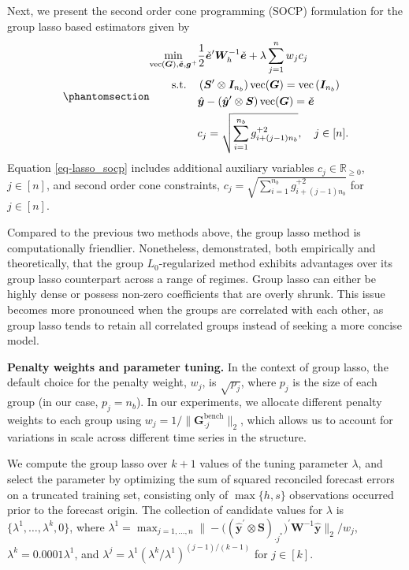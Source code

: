 \documentclass[
  11pt]{article}
\theoremstyle{plain}
\theoremstyle{remark}
\begin{document}
Next, we present the second order cone programming (SOCP) formulation
for the group lasso based estimators given by
\begin{equation}\phantomsection\label{eq-lasso_socp}{
\begin{aligned}
\min_{\operatorname{vec}(\bm{G}), \check{\bm{e}}, \bm{g}^{+}} & \frac{1}{2}\check{\bm{e}}^{\prime} \bm{W}_h^{-1}\check{\bm{e}} + \lambda \sum_{j=1}^n w_j c_j \\
\text{s.t.} \quad & \left(\bm{S}^{\prime} \otimes \bm{I}_{n_b}\right) \operatorname{vec}(\bm{G})=\operatorname{vec}\left(\bm{I}_{n_b}\right) \\
& \hat{\bm{y}}-\left(\hat{\bm{y}}^{\prime} \otimes \bm{S}\right) \operatorname{vec}(\bm{G}) = \check{\bm{e}} \\
& c_j = \sqrt{\sum_{i=1}^{n_b} g_{i + (j-1) n_b}^{+2}}, \quad j \in[n].
\end{aligned}
}\end{equation} Equation \eqref{eq-lasso_socp} includes additional
auxiliary variables \(c_j \in \mathbb{R}_{\geq 0}\), \(j \in [n]\), and
second order cone constraints,
\(c_j = \sqrt{\sum_{i=1}^{n_b} g_{i + (j-1) n_b}^{+2}}\) for
\(j \in[n]\).

Compared to the previous two methods above, the group lasso method is
computationally friendlier. Nonetheless, \citet{Hazimeh2023-ie}
demonstrated, both empirically and theoretically, that the group
\(L_0\)-regularized method exhibits advantages over its group lasso
counterpart across a range of regimes. Group lasso can either be highly
dense or possess non-zero coefficients that are overly shrunk. This
issue becomes more pronounced when the groups are correlated with each
other, as group lasso tends to retain all correlated groups instead of
seeking a more concise model.

\textbf{Penalty weights and parameter tuning.} In the context of group
lasso, the default choice for the penalty weight, \(w_j\), is
\(\sqrt{p_j}\), where \(p_j\) is the size of each group (in our case,
\(p_j = n_b\)). In our experiments, we allocate different penalty
weights to each group using
\(w_j = 1/\|\bm{G}_{\cdot j}^{\text{bench}}\|_2\), which allows us to
account for variations in scale across different time series in the
structure.

We compute the group lasso over \(k+1\) values of the tuning parameter
\(\lambda\), and select the parameter by optimizing the sum of squared
reconciled forecast errors on a truncated training set, consisting only
of \(\max\{h, s\}\) observations occurred prior to the forecast origin.
The collection of candidate values for \(\lambda\) is
\(\{\lambda^{1},\dots,\lambda^{k}, 0\}\), where
\(\lambda^{1} = \max_{j=1, \ldots, n}\big\|-\big((\hat{\bm{y}}^{\prime} \otimes \bm{S})_{\cdot j^{*}}\big)^{\prime} \bm{W}^{-1} \hat{\bm{y}}\big\|_2 / w_j\),
\(\lambda^{k} = 0.0001\lambda^{1}\), and
\(\lambda^{j} = \lambda^{1}(\lambda^{k} / \lambda^{1})^{(j-1) / (k-1)}\)
for \(j \in [k]\).
\end{document}
